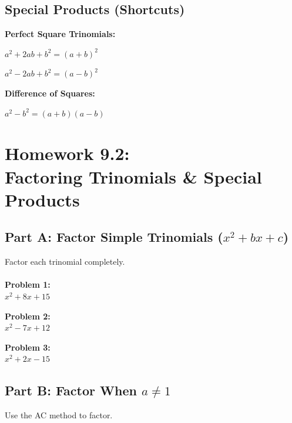 \documentclass[12pt]{article}
\begin{document}
		\subsection*{Special Products (Shortcuts)}

			\textbf{Perfect Square Trinomials:}

			$a^2 + 2ab + b^2 = (a + b)^2$

			$a^2 - 2ab + b^2 = (a - b)^2$

			\textbf{Difference of Squares:}

			$a^2 - b^2 = (a + b)(a - b)$

		\newpage

	\section*{Homework 9.2: \\ Factoring Trinomials \& Special Products}

		\subsection*{Part A: Factor Simple Trinomials ($x^2 + bx + c$)}

			Factor each trinomial completely.\\\\

			\textbf{Problem 1:}\\
            
            $x^2 + 8x + 15$

			\vspace{4cm}

			\textbf{Problem 2:}\\
            
            $x^2 - 7x + 12$

			\vspace{4cm}

			\textbf{Problem 3:}\\
            
            $x^2 + 2x - 15$

			\newpage

		\subsection*{Part B: Factor When $a \neq 1$}

			Use the AC method to factor.\\\\
\end{document}
